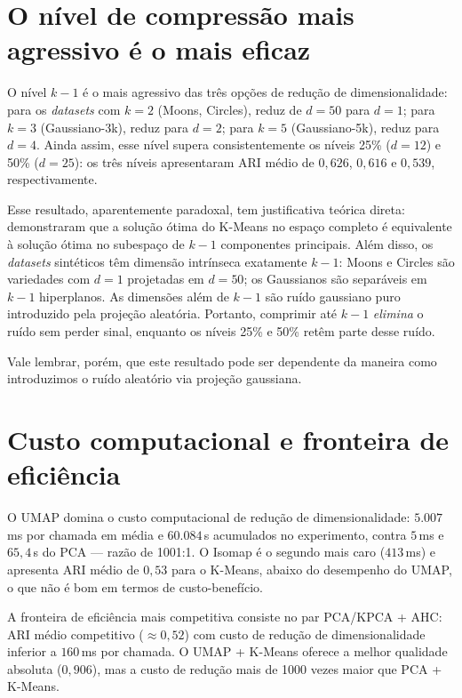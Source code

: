 \documentclass[12pt,a4paper]{report}
\begin{document}
\section*{O nível de compressão mais agressivo é o mais eficaz}

O nível $k-1$ é o mais agressivo das três opções de redução de
dimensionalidade: para os \textit{datasets} com $k=2$ (Moons, Circles),
reduz de $d=50$ para $d=1$; para $k=3$ (Gaussiano-3k), reduz para $d=2$; para
$k=5$ (Gaussiano-5k), reduz para $d=4$. Ainda assim, esse nível supera
consistentemente os níveis 25\% ($d = 12$) e 50\% ($d = 25$): os três níveis
apresentaram ARI médio de $0{,}626$, $0{,}616$ e $0{,}539$, respectivamente.

Esse resultado, aparentemente paradoxal, tem justificativa teórica direta:
\citet{ding2004} demonstraram que a solução ótima do K-Means no espaço
completo é equivalente à solução ótima no subespaço de $k-1$ componentes
principais. Além disso, os \textit{datasets} sintéticos têm dimensão
intrínseca exatamente $k-1$: Moons e Circles são variedades com $d=1$
projetadas em $d=50$; os Gaussianos são separáveis em $k-1$ hiperplanos. As
dimensões além de $k-1$ são ruído gaussiano puro introduzido pela projeção
aleatória. Portanto, comprimir até $k-1$ \textit{elimina} o ruído sem perder
sinal, enquanto os níveis 25\% e 50\% retêm parte desse ruído.

Vale lembrar, porém, que este resultado pode ser dependente da maneira como
introduzimos o ruído aleatório via projeção gaussiana.

\section*{Custo computacional e fronteira de eficiência}

O UMAP domina o custo computacional de redução de dimensionalidade:
$5{.}007$\,ms por chamada em média e $60{.}084$\,s acumulados no experimento,
contra $5$\,ms e $65{,}4$\,s do PCA --- razão de 1001:1. O Isomap é o segundo
mais caro ($413$\,ms) e apresenta ARI médio de $0{,}53$ para o K-Means,
abaixo do desempenho do UMAP, o que não é bom em termos de custo-benefício.

A fronteira de eficiência mais competitiva consiste no par PCA/KPCA + AHC:
ARI médio competitivo ($\approx 0{,}52$) com custo de redução de
dimensionalidade inferior a $160$\,ms por chamada. O UMAP + K-Means oferece
a melhor qualidade absoluta ($0{,}906$), mas a custo de redução mais de 1000
vezes maior que PCA + K-Means.
\end{document}
